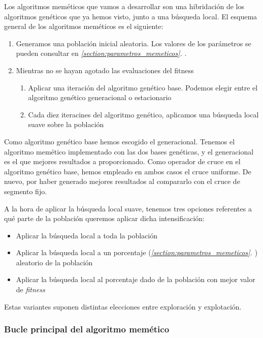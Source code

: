 \documentclass[11pt]{article}
\begin{document}
Los algoritmos meméticos que vamos a desarrollar son una hibridación de los algoritmos genéticos que ya hemos visto, junto a una búsqueda local. El esquema general de los algoritmos meméticos es el siguiente:

\begin{enumerate}
    \item Generamos una población inicial aleatoria. Los valores de los parámetros se pueden consultar en \emph{\ref{section:parametros_memeticos}. }.
    \item Mientras no se hayan agotado las evaluaciones del fitness
        \begin{enumerate}
            \item Aplicar una iteración del algoritmo genético base. Podemos elegir entre el algoritmo genético generacional o estacionario
            \item Cada diez iteracines del algoritmo genético, aplicamos una búsqueda local suave sobre la población
        \end{enumerate}
\end{enumerate}

Como algoritmo genético base hemos escogido el generacional. Tenemos el algoritmo memético implementado con las dos bases genéticas, y el generacional es el que mejores resultados a proporcionado. Como operador de cruce en el algoritmo genético base, hemos empleado en ambos casos el cruce uniforme. De nuevo, por haber generado mejores resultados al compararlo con el cruce de segmento fijo.

A la hora de aplicar la búsqueda local suave, tenemos tres opciones referentes a qué parte de la población queremos aplicar dicha intensificación:

\begin{itemize}
    \item Aplicar la búsqueda local a toda la población
    \item Aplicar la búsqueda local a un porcentaje (\emph{\ref{section:parametros_memeticos}. }) aleatorio de la población
    \item Aplicar la búsqueda local al porcentaje dado de la población con mejor valor de \emph{fitness}
\end{itemize}

Estas variantes suponen distintas elecciones entre exploración y explotación.

\subsubsection{Bucle principal del algoritmo memético}
\end{document}
